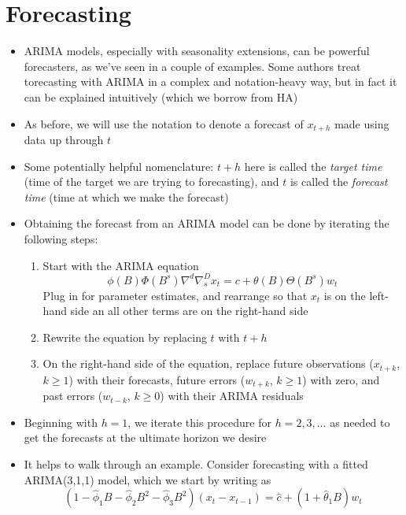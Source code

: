 \documentclass{article}
\begin{document}
\section{Forecasting}

\begin{itemize}
\item ARIMA models, especially with seasonality extensions, can be powerful 
  forecasters, as we've seen in a couple of examples. Some authors treat
  torecasting with ARIMA in a complex and notation-heavy way, but in fact it can
  be explained intuitively (which we borrow from HA)

\item As before, we will use the notation  to denote
  a forecast of $x_{t+h}$ made using data up through $t$

\item Some potentially helpful nomenclature: $t+h$ here is called the
  \emph{target time} (time of the target we are trying to forecasting), and $t$
  is called the \emph{forecast time} (time at which we make the forecast) 

\item Obtaining the forecast  from an ARIMA model can 
  be done by iterating the following steps: 

\begin{enumerate}
\item Start with the ARIMA equation
  \[
  \phi(B) \Phi(B^s) \nabla^d \nabla_s^D x_t = c + \theta(B) \Theta(B^s) w_t   
  \]
  Plug in for parameter estimates, and rearrange so that $x_t$ is on the
  left-hand side an all other terms are on the right-hand side 

\item Rewrite the equation by replacing $t$ with $t+h$

\item On the right-hand side of the equation, replace future observations
  ($x_{t+k}$, $k \geq 1$) with their forecasts, future errors ($w_{t+k}$, $k
  \geq 1$) with zero, and past errors ($w_{t-k}$, $k \geq 0$) with their ARIMA 
  residuals   
\end{enumerate}

\item Beginning with $h = 1$, we iterate this procedure for $h = 2,3,\dots$ as
  needed to get the forecasts at the ultimate horizon we desire  

\item It helps to walk through an example. Consider forecasting with a fitted 
  ARIMA(3,1,1) model, which we start by writing as
  \[
  (1 - \hat\phi_1 B - \hat\phi_2 B^2 - \hat\phi_3 B^2) (x_t - x_{t-1}) = \hat{c}
  + (1 + \hat\theta_1 B) w_t
  \]


\end{itemize}
\end{document}
